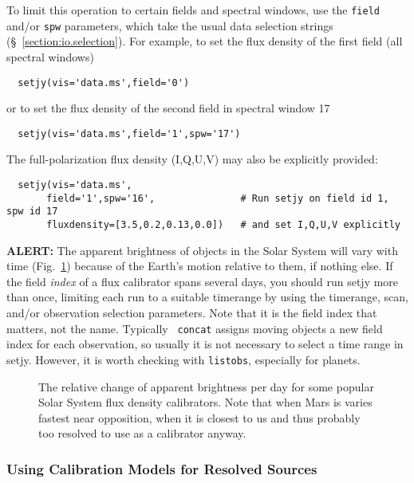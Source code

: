 To limit this operation to certain fields and spectral windows, use
the {\tt field} and/or {\tt spw} parameters, which take the usual
data selection strings (\S~\ref{section:io.selection}). For example, 
to set the flux density of the first field (all spectral windows)
\small
\begin{verbatim}
  setjy(vis='data.ms',field='0')
\end{verbatim}
\normalsize
or to set the flux density of the second field in spectral window 17
\small
\begin{verbatim}
  setjy(vis='data.ms',field='1',spw='17')
\end{verbatim}
\normalsize
The full-polarization flux density (I,Q,U,V) may also be explicitly provided:
\small
\begin{verbatim}
  setjy(vis='data.ms',
       field='1',spw='16',               # Run setjy on field id 1, spw id 17
       fluxdensity=[3.5,0.2,0.13,0.0])   # and set I,Q,U,V explicitly
\end{verbatim}
\normalsize


{\bf ALERT:} The apparent brightness of objects in the Solar System
will vary with time (Fig.~\ref{fig:reldelfdperday}) because of the
Earth's motion relative to them, if nothing else.  If the field {\it
  index} of a flux calibrator spans several days, you should run setjy
more than once, limiting each run to a suitable timerange by using the
timerange, scan, and/or observation selection parameters.  Note that
it is the field index that matters, not the name.  Typically {\tt
  concat} assigns moving objects a new field index for each
observation, so usually it is not necessary to select a time range in
setjy.  However, it is worth checking with {\tt listobs}, especially
for planets.

\begin{figure}
\label{fig:reldelfdperday}
\caption{The relative change of apparent brightness per day for some
popular Solar System flux density calibrators.  Note that when Mars is
varies fastest near opposition, when it is closest to us and thus probably
too resolved to use as a calibrator anyway.}  
\end{figure}


\subsubsection{Using Calibration Models for Resolved Sources}
\label{section:cal.prior.models.resolved}

